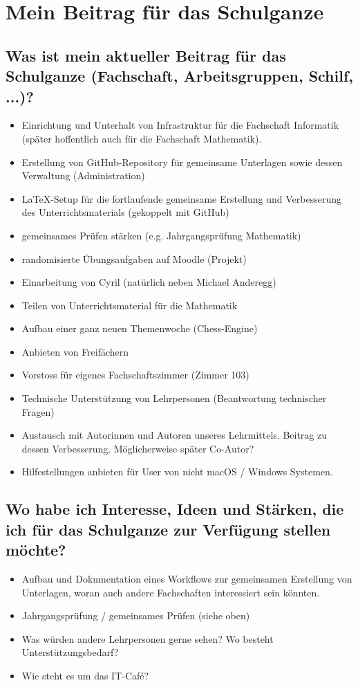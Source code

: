 \section{Mein Beitrag für das Schulganze}
\subsection{Was ist mein aktueller Beitrag für das Schulganze (Fachschaft, Arbeitsgruppen,
	Schilf, ...)?}
\begin{itemize}
	\item Einrichtung und Unterhalt von Infrastruktur für die Fachschaft Informatik (später hoffentlich auch für die Fachschaft Mathematik).
	\item Erstellung von GitHub-Repository für gemeinsame Unterlagen sowie dessen Verwaltung (Administration)
	\item \LaTeX-Setup für die fortlaufende gemeinsame Erstellung und Verbesserung des Unterrichtsmaterials (gekoppelt mit GitHub)
	\item gemeinsames Prüfen stärken (e.g. Jahrgangsprüfung Mathematik)
	\item randomisierte Übungsaufgaben auf Moodle (Projekt)
	\item Einarbeitung von Cyril (natürlich neben Michael Anderegg)
	\item Teilen von Unterrichtsmaterial für die Mathematik
	\item Aufbau einer ganz neuen Themenwoche (Chess-Engine)
	\item Anbieten von Freifächern
	\item Vorstoss für eigenes Fachschaftszimmer (Zimmer 103)
	\item Technische Unterstützung von Lehrpersonen (Beantwortung technischer Fragen)
	\item Austausch mit Autorinnen und Autoren unseres Lehrmittels. Beitrag zu dessen Verbesserung. Möglicherweise später Co-Autor?
	\item Hilfestellungen anbieten für User von nicht macOS / Windows Systemen.
\end{itemize}
\subsection{Wo habe ich Interesse, Ideen und Stärken, die ich für das Schulganze zur Verfügung stellen möchte?}
\begin{itemize}
	\item Aufbau und Dokumentation eines Workflows zur gemeinsamen Erstellung von Unterlagen, woran auch andere Fachschaften interessiert sein könnten.
	\item Jahrgangsprüfung / gemeinsames Prüfen (siehe oben)
	\item Was würden andere Lehrpersonen gerne sehen? Wo besteht Unterstützungsbedarf?
	\item Wie steht es um das IT-Café?
\end{itemize}

